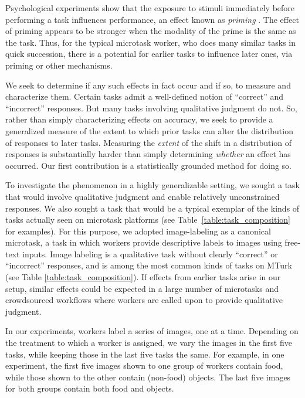 \documentclass{sigchi}
\begin{document}
Psychological experiments show that the exposure to stimuli immediately 
before performing a task influences performance, an effect known as 
\textit{priming} \cite{BJOP1796}.
The effect of priming appears to be stronger when the modality of the
prime is the same as the task.
Thus, for the typical microtask worker, who does many similar tasks in
quick succession, there is a potential for earlier tasks to influence
later ones, via priming or other mechanisms.

We seek to determine if any such effects in fact occur and if so, 
to measure and characterize them.
Certain tasks admit a well-defined notion of ``correct'' and 
``incorrect'' responses.  But many tasks involving qualitative judgment
do not.  So, rather than simply characterizing effects on accuracy, we seek
to provide a generalized measure of the extent to which prior tasks
can alter the distribution of responses to later tasks.  
Measuring the \textit{extent} of the shift in a distribution of responses 
is substantially harder than simply determining \textit{whether} an effect 
has occurred.  Our first contribution is a statistically grounded method 
for doing so.

To investigate the phenomenon in a
highly generalizable setting, we sought a task that would involve 
qualitative judgment and enable relatively unconstrained responses. 
We also sought a task that would be a typical exemplar of the kinds of
tasks actually seen on microtask platforms (see 
Table~\ref{table:task_composition} for examples).  For this purpose, we 
adopted
image-labeling as a canonical microtask, a task in which workers provide 
descriptive labels to images using free-text inputs.  Image labeling is
a qualitative task without clearly ``correct'' or ``incorrect'' responses,
and is among the most common kinds of tasks on MTurk 
(see Table \ref{table:task_composition}).
If effects from earlier tasks arise in our setup, similar effects could be 
expected in 
a large number of microtasks and crowdsourced workflows where workers are 
called upon to provide qualitative judgment.

In our experiments, workers label a series of images, one at a time.
Depending on the treatment to which a worker is assigned, we vary the
images in the first five tasks, while keeping those in the last five tasks 
the same.  For example, in one experiment, the first five images shown to
one group of workers contain food, while those shown to the other 
contain (non-food) objects.  The last five images for both
groups contain both food and objects.
\end{document}
